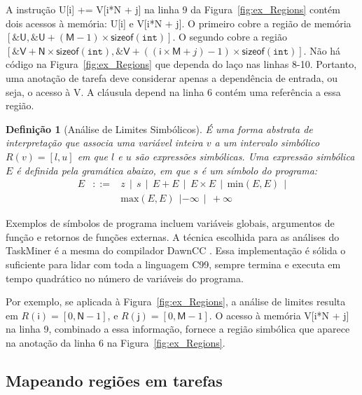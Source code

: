 \documentclass[sigconf]{acmart}
\newcommand\dawn{\mbox{\textsf{DawnCC}}}
\newcommand\Taskminer{\mbox{\textsf{TaskMiner}}}
\newtheorem{Definicao}{Defini\c{c}\~{a}o}
\begin{document}
A instrução \textsf{U[i] += V[i*N + j]} na linha 9 da Figura~\ref{fig:ex_Regions}
contém dois acessos à memória: \textsf{U[i]} e
\textsf{V[i*N + j]}.
 O primeiro cobre a região de memória $[\mathtt{\&}\mathsf{U},
\mathtt{\&}\mathsf{U} + (\mathsf{M} - 1) \times \mathsf{sizeof}(\mathtt{int})]$.
O segundo cobre a região 
$[\mathtt{\&}\mathsf{V} + \mathsf{N} \times \mathsf{sizeof}(\mathtt{int}), \mathtt{\&}\mathsf{V} + ((\mathsf{i} \times \mathsf{M} + j) - 1) \times \mathsf{sizeof}(\mathtt{int})]$.
Não há código na Figura~\ref{fig:ex_Regions} que dependa do laço nas linhas 8-10.
Portanto, uma anotação de tarefa deve considerar apenas a dependência de entrada, ou seja,
o acesso à \textsf{V}. A cláusula \textsf{depend} na linha 6 contém uma referência
a essa região.

\begin{Definicao} [Análise de Limites Simbólicos]
\label{def:limites}
É uma forma abstrata de interpretação que associa uma variável inteira $v$
a um intervalo simbólico $R(v) = [l, u]$ em que $l$ e $u$ são expressões simbólicas.
Uma expressão simbólica $E$ é definida pela gramática abaixo, em que $s$ é um 
símbolo do programa:
\renewcommand{\arraystretch}{0.9}
\[
\begin{array}{rcl}
E & ::= & z \ \ | \ \ s \ \ | \ \ E + E \ \ | \ \ E \times E \ \ | \ \  \mbox{min}(E, E) \ \ | \\
&  & \mbox{max}(E, E) \ \ | -\infty \ \ | \ \ +\infty
\end{array}
\]
\end{Definicao}

Exemplos de símbolos de programa incluem variáveis globais, argumentos de função e retornos de
funções externas. A técnica
escolhida para as análises do {\Taskminer} é a mesma do compilador \dawn{} \cite{Mendonca17}.
Essa implementação é sólida o suficiente para lidar com toda a linguagem C99, sempre termina
e executa em tempo quadrático no número de variáveis do programa.

Por exemplo, se aplicada à Figura~\ref{fig:ex_Regions}, a análise de limites resulta em 
$R(\mathsf{i}) = [0, \mathsf{N} - 1]$, e $R(\mathsf{j}) = [0, \mathsf{M} - 1]$.
O acesso à memória \textsf{V[i*N + j]} na linha 9, combinado a essa informação, fornece
a região simbólica que aparece na anotação da linha 6 na Figura~\ref{fig:ex_Regions}.

\subsection{Mapeando regiões em tarefas}
\label{sub:identification}
\end{document}
